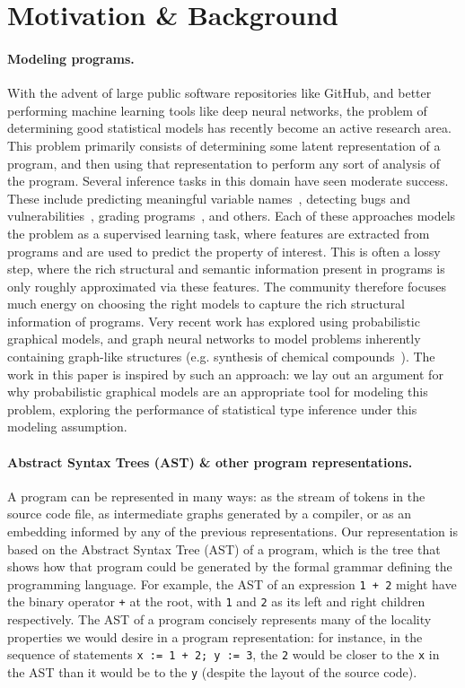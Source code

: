 \section{Motivation \& Background}
\label{sec:motivation}

\paragraph{Modeling programs.}
With the advent of large public software repositories like GitHub, and better performing machine learning tools like deep neural networks, the problem of determining good statistical models has recently become an active research area.
This problem primarily consists of determining some latent representation of a program, and then using that representation to perform any sort of analysis of the program.
Several inference tasks in this domain have seen moderate success.
These include predicting meaningful variable names~\cite{bigcode}, detecting bugs and vulnerabilities~\cite{bugs}, grading programs~\cite{ss}, and others.
Each of these approaches models the problem as a supervised learning task, where features are extracted from programs and are used to predict the property of interest.
This is often a lossy step, where the rich structural and semantic information present in programs is only roughly approximated via these features.
The community therefore focuses much energy on choosing the right models to capture the rich structural information of programs.
Very recent work has explored using probabilistic graphical models, and graph neural networks to model problems inherently containing graph-like structures (e.g. synthesis of chemical compounds~\cite{chemnips}).
The work in this paper is inspired by such an approach: we lay out an argument for why probabilistic graphical models are an appropriate tool for modeling this problem, exploring the performance of statistical type inference under this modeling assumption.

\paragraph{Abstract Syntax Trees (AST) \& other program representations.}
A program can be represented in many ways: as the stream of tokens in the source code file, as intermediate graphs generated by a compiler, or as an embedding informed by any of the previous representations.
Our representation is based on the Abstract Syntax Tree (AST) of a program, which is the tree that shows how that program could be generated by the formal grammar defining the programming language.
For example, the AST of an expression \texttt{1 + 2} might have the binary operator \texttt{+} at the root, with \texttt{1} and \texttt{2} as its left and right children respectively.
The AST of a program concisely represents many of the locality properties we would desire in a program representation: for instance, in the sequence of statements \mbox{\texttt{x := 1 + 2; y := 3}}, the \texttt{2} would be closer to the \texttt{x} in the AST than it would be to the \texttt{y} (despite the layout of the source code).

